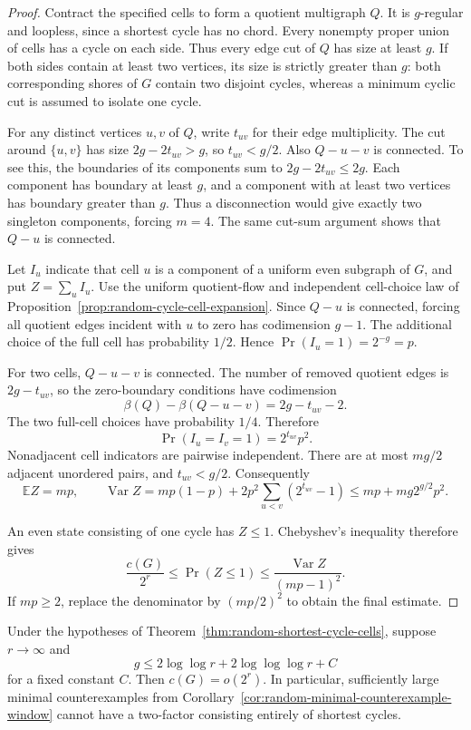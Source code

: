 \begin{proof}
Contract the specified cells to form a quotient multigraph $Q$.
It is $g$-regular and loopless, since a shortest cycle has no chord.
Every nonempty proper union of cells has a cycle on each side.
Thus every edge cut of $Q$ has size at least $g$.
If both sides contain at least two vertices, its size is strictly greater than $g$:
both corresponding shores of $G$ contain two disjoint cycles, whereas a minimum cyclic cut is assumed to isolate one cycle.

For any distinct vertices $u,v$ of $Q$, write $t_{uv}$ for their edge multiplicity.
The cut around $\{u,v\}$ has size $2g-2t_{uv}>g$, so $t_{uv}<g/2$.
Also $Q-u-v$ is connected.
To see this, the boundaries of its components sum to $2g-2t_{uv}\le2g$.
Each component has boundary at least $g$, and a component with at least two vertices has boundary greater than $g$.
Thus a disconnection would give exactly two singleton components, forcing $m=4$.
The same cut-sum argument shows that $Q-u$ is connected.

Let $I_u$ indicate that cell $u$ is a component of a uniform even subgraph of $G$, and put $Z=\sum_u I_u$.
Use the uniform quotient-flow and independent cell-choice law of Proposition~\ref{prop:random-cycle-cell-expansion}.
Since $Q-u$ is connected, forcing all quotient edges incident with $u$ to zero has codimension $g-1$.
The additional choice of the full cell has probability $1/2$.
Hence $\Pr(I_u=1)=2^{-g}=p$.

For two cells, $Q-u-v$ is connected.
The number of removed quotient edges is $2g-t_{uv}$, so the zero-boundary conditions have codimension
\[
 \beta(Q)-\beta(Q-u-v)=2g-t_{uv}-2.
\]
The two full-cell choices have probability $1/4$.
Therefore
\[
 \Pr(I_u=I_v=1)=2^{t_{uv}}p^2.
\]
Nonadjacent cell indicators are pairwise independent.
There are at most $mg/2$ adjacent unordered pairs, and $t_{uv}<g/2$.
Consequently
\[
 \mathbb EZ=mp,\qquad
 \operatorname{Var}Z
 =mp(1-p)+2p^2\sum_{u<v}(2^{t_{uv}}-1)
 \le mp+mg2^{g/2}p^2.
\]

An even state consisting of one cycle has $Z\le1$.
Chebyshev's inequality therefore gives
\[
 \frac{c(G)}{2^r}\le\Pr(Z\le1)
 \le\frac{\operatorname{Var}Z}{(mp-1)^2}.
\]
If $mp\ge2$, replace the denominator by $(mp/2)^2$ to obtain the final estimate.
\end{proof}

\begin{corollary}
\label{cor:random-shortest-cycle-cell-window}
Under the hypotheses of Theorem~\ref{thm:random-shortest-cycle-cells}, suppose $r\to\infty$ and
\[
 g\le2\log\log r+2\log\log\log r+C
\]
for a fixed constant $C$.
Then $c(G)=o(2^r)$.
In particular, sufficiently large minimal counterexamples from
Corollary~\ref{cor:random-minimal-counterexample-window} cannot have a two-factor consisting entirely of shortest cycles.
\end{corollary}

